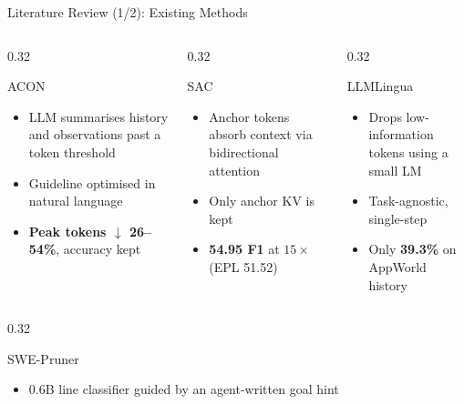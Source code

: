 \documentclass[aspectratio=169,10pt]{beamer}
\begin{document}
\begin{frame}{Literature Review (1/2): Existing Methods}
\begin{columns}[T]
\begin{column}{0.32\textwidth}
\begin{block}{ACON \cite{ACON}}
\footnotesize
\begin{itemize}
  \item LLM summarises history and observations past a token threshold
  \item Guideline optimised in natural language
  \item \textbf{Peak tokens $\downarrow$ 26--54\%}, accuracy kept
\end{itemize}
\end{block}
\end{column}
\begin{column}{0.32\textwidth}
\begin{block}{SAC \cite{SAC}}
\footnotesize
\begin{itemize}
  \item Anchor tokens absorb context via bidirectional attention
  \item Only anchor KV is kept
  \item \textbf{54.95 F1} at $15\times$ (EPL 51.52)
\end{itemize}
\end{block}
\end{column}
\begin{column}{0.32\textwidth}
\begin{block}{LLMLingua \cite{LLMLingua}}
\footnotesize
\begin{itemize}
  \item Drops low-information tokens using a small LM
  \item Task-agnostic, single-step
  \item Only \textbf{39.3\%} on AppWorld history
\end{itemize}
\end{block}
\end{column}
\end{columns}
\vspace{0.05cm}
\begin{columns}[T]
\begin{column}{0.32\textwidth}
\begin{block}{SWE-Pruner \cite{SWEPruner}}
\footnotesize
\begin{itemize}
  \item 0.6B line classifier guided by an agent-written goal hint

\end{itemize}
\end{block}
\end{column}
\end{columns}
\end{frame}
\end{document}
